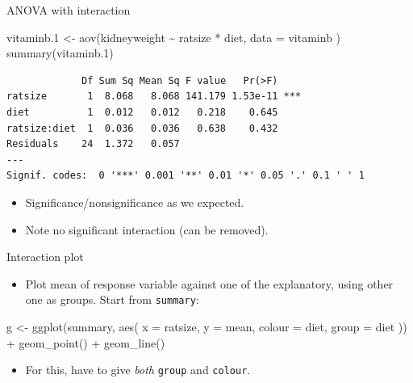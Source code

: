 \documentclass[
  ignorenonframetext,
]{beamer}
\newenvironment{Shaded}{\begin{snugshade}}{\end{snugshade}}
\newcommand{\AttributeTok}[1]{\textcolor[rgb]{0.40,0.45,0.13}{#1}}
\newcommand{\FloatTok}[1]{\textcolor[rgb]{0.68,0.00,0.00}{#1}}
\newcommand{\FunctionTok}[1]{\textcolor[rgb]{0.28,0.35,0.67}{#1}}
\newcommand{\NormalTok}[1]{\textcolor[rgb]{0.00,0.23,0.31}{#1}}
\newcommand{\OtherTok}[1]{\textcolor[rgb]{0.00,0.23,0.31}{#1}}
\newcommand{\SpecialCharTok}[1]{\textcolor[rgb]{0.37,0.37,0.37}{#1}}
\providecommand{\tightlist}{%
  \setlength{\itemsep}{0pt}\setlength{\parskip}{0pt}}\usepackage{longtable,booktabs,array}
\begin{document}
\begin{frame}[fragile]{ANOVA with interaction}
\protect\hypertarget{anova-with-interaction}{}
\begin{Shaded}
\begin{Highlighting}[]
\NormalTok{vitaminb}\FloatTok{.1} \OtherTok{\textless{}{-}} \FunctionTok{aov}\NormalTok{(kidneyweight }\SpecialCharTok{\textasciitilde{}}\NormalTok{ ratsize }\SpecialCharTok{*}\NormalTok{ diet,}
  \AttributeTok{data =}\NormalTok{ vitaminb}
\NormalTok{)}
\FunctionTok{summary}\NormalTok{(vitaminb}\FloatTok{.1}\NormalTok{)}
\end{Highlighting}
\end{Shaded}

\begin{verbatim}
             Df Sum Sq Mean Sq F value   Pr(>F)    
ratsize       1  8.068   8.068 141.179 1.53e-11 ***
diet          1  0.012   0.012   0.218    0.645    
ratsize:diet  1  0.036   0.036   0.638    0.432    
Residuals    24  1.372   0.057                     
---
Signif. codes:  0 '***' 0.001 '**' 0.01 '*' 0.05 '.' 0.1 ' ' 1
\end{verbatim}

\begin{itemize}
\tightlist
\item
  Significance/nonsignificance as we expected.
\item
  Note no significant interaction (can be removed).
\end{itemize}
\end{frame}

\begin{frame}[fragile]{Interaction plot}
\protect\hypertarget{interaction-plot}{}
\begin{itemize}
\tightlist
\item
  Plot mean of response variable against one of the explanatory, using
  other one as groups. Start from \texttt{summary}:
\end{itemize}

\begin{Shaded}
\begin{Highlighting}[]
\NormalTok{g }\OtherTok{\textless{}{-}} \FunctionTok{ggplot}\NormalTok{(summary, }\FunctionTok{aes}\NormalTok{(}
  \AttributeTok{x =}\NormalTok{ ratsize, }\AttributeTok{y =}\NormalTok{ mean,}
  \AttributeTok{colour =}\NormalTok{ diet, }\AttributeTok{group =}\NormalTok{ diet}
\NormalTok{)) }\SpecialCharTok{+}
  \FunctionTok{geom\_point}\NormalTok{() }\SpecialCharTok{+} \FunctionTok{geom\_line}\NormalTok{()}
\end{Highlighting}
\end{Shaded}

\begin{itemize}
\tightlist
\item
  For this, have to give \emph{both} \texttt{group} and \texttt{colour}.
\end{itemize}
\end{frame}
\end{document}
